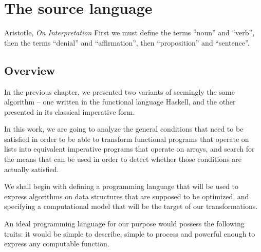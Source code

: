 \chapter{The source language}

\begin{chapquote}{Aristotle, \textit{On Interpretation}}
  First we must define the terms ``noun'' and ``verb'', then
  the terms ``denial'' and ``affirmation'', then ``proposition''
  and ``sentence''.
\end{chapquote}

\section{Overview}

In the previous chapter, we presented two variants of seemingly
the same algorithm -- one written in the functional language Haskell,
and the other presented in its classical imperative form.

In this work, we are going to analyze the general conditions
that need to be satisfied in order to be able to transform functional
programs that operate on lists into equivalent imperative programs
that operate on arrays, and search for the means that can be used
in order to detect whether those conditions are actually satisfied.

We shall begin with defining a programming language
that will be used to express algorithms on data structures
that are supposed to be optimized, and specifying a computational
model that will be the target of our transformations.



An ideal programming language for our purpose would possess the
following traits: it would be simple to describe, simple to process
and powerful enough to express any computable function.

